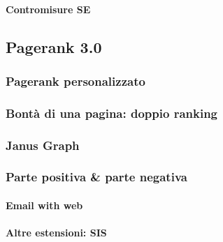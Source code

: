 				\paragraph{Contromisure SE}
			
		\subsection{Pagerank 3.0}
		
			\subsubsection{Pagerank personalizzato}
			
			\subsubsection{Bontà di una pagina: doppio ranking}
			
			\subsubsection{Janus Graph}
			
			\subsubsection{Parte positiva \& parte negativa}
			
				\paragraph{Email with web}
				
				\paragraph{Altre estensioni: SIS}